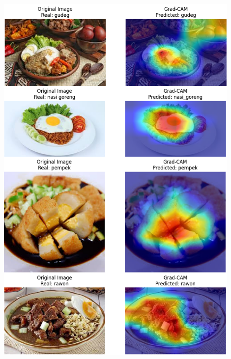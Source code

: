 \clearpage
\begin{afigure}
    \includegraphics[width=0.9\textwidth, center]{images/grad-cam-2.png}
    \label{fig:grad-cam-2}
\end{afigure}
\clearpage
